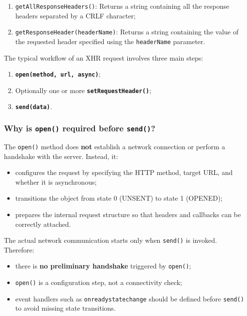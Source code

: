 \documentclass{scrbook}
\begin{document}
\begin{enumerate}
		In this case the header becomes:
		
	\begin{lstlisting}
	Content-Type: application/json
	X-Auth: 123, 456
	\end{lstlisting}
		
		\item \texttt{getAllResponseHeaders()}: Returns a string containing all the response headers separated by a CRLF character;
		
		\item \texttt{getResponseHeader(headerName)}: Returns a string containing the value of the requested header specified using the \texttt{headerName} parameter.
	\end{enumerate}
	
	The typical workflow of an XHR request involves three main steps:
	
	\begin{enumerate}
		\item \textbf{\texttt{open(method, url, async)}};
		
		\item Optionally one or more \textbf{\texttt{setRequestHeader()}};
		
		\item \textbf{\texttt{send(data)}}.
	\end{enumerate}
	
	\subsubsection{Why is \texttt{open()} required before \texttt{send()}?}
	
	The \texttt{open()} method does \textbf{not} establish a network connection or perform a handshake with the server. Instead, it:
	
	\begin{itemize}
		\item configures the request by specifying the HTTP method, target URL, and whether it is asynchronous;
		\item transitions the object from state 0 (UNSENT) to state 1 (OPENED);
		\item prepares the internal request structure so that headers and callbacks can be correctly attached.
	\end{itemize}
	
	The actual network communication starts only when \texttt{send()} is invoked. Therefore:
	
	\begin{itemize}
		\item there is \textbf{no preliminary handshake} triggered by \texttt{open()};
		\item \texttt{open()} is a configuration step, not a connectivity check;
		\item event handlers such as \texttt{onreadystatechange} should be defined before \texttt{send()} to avoid missing state transitions.
	\end{itemize}
	
\end{document}

